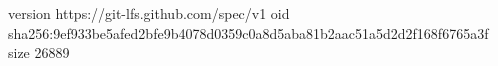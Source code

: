 version https://git-lfs.github.com/spec/v1
oid sha256:9ef933be5afed2bfe9b4078d0359c0a8d5aba81b2aac51a5d2d2f168f6765a3f
size 26889
